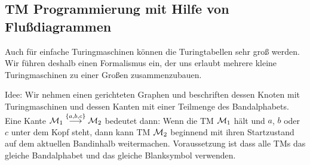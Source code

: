 % 
% 

\subsection{\ac{TM} Programmierung mit Hilfe von Flußdiagrammen}
% 
Auch für einfache Turingmaschinen können die Turingtabellen sehr groß werden.
Wir führen deshalb einen Formalismus ein, der uns erlaubt mehrere kleine Turingmaschinen zu einer Großen zusammenzubauen.

Idee: Wir nehmen einen gerichteten Graphen und beschriften dessen Knoten mit Turingmaschinen und dessen Kanten mit einer Teilmenge des Bandalphabets.
Eine Kante $\mathcal{M}_1\stackrel{\{a,b,c\}}{\longrightarrow}\mathcal{M}_2$ bedeutet dann:
Wenn die TM $\mathcal{M}_1$ hält und $a$, $b$ oder $c$ unter dem Kopf steht, dann kann TM $\mathcal{M}_2$ beginnend mit ihren Startzustand auf dem aktuellen Bandinhalb weitermachen.
Voraussetzung ist dass alle TMs das gleiche Bandalphabet und das gleiche Blanksymbol verwenden.

